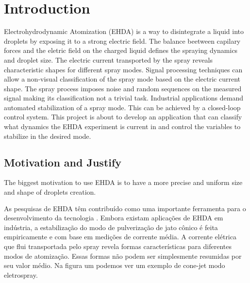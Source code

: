 \chapter{Introduction}
\label{chap:intro} %

Electrohydrodynamic Atomization (EHDA) is a way to disintegrate a liquid into droplets by exposing it to a strong electric field.\cite{prunet}
The balance beetween capilary forces and the eletric field on the charged liquid defines the spraying dynamics and droplet size.
The electric current transported by the spray reveals characteristic shapes for different spray modes.
Signal processing techniques can allow a non-visual classification of the spray mode based on the electric current shape.\cite{Sjaaks}
The spray process imposes noise and random sequences on the measured signal making its classification not a trivial task. 
Industrial applications demand automated stabilization of a spray mode. 
This can be achieved by a closed-loop control system. 
This project is about to develop an application that can classify what dynamics the EHDA experiment is current in and control the variables to stabilize in the desired mode. 


\section{Motivation and Justify}
\label{sec:motivacao}


The biggest motivation to use EHDA is to have a more precise and uniform size and shape of droplets creation.


As pesquisas de EHDA têm contribuído como uma importante ferramenta para
o desenvolvimento da tecnologia . Embora existam aplicações de EHDA em
indústria, a estabilização do modo de pulverização de jato cônico é feita empiricamente e com base em medições de corrente média.
A corrente elétrica que flui transportada pelo spray revela formas características para diferentes modos de atomização.
Essas formas não podem ser simplesmente resumidas por seu valor médio. Na figura um podemos ver um exemplo de cone-jet
modo eletrospray.

